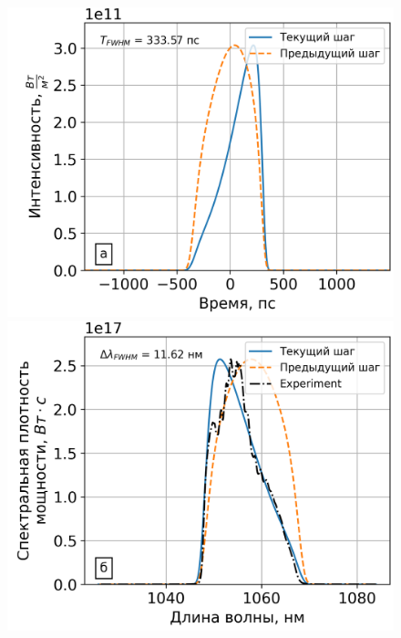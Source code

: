 \documentclass[12pt]{article}
\begin{document}
\begin{figure}[h!]
  \centering
  \begin{minipage}[b]{0.5\textwidth}
    \includegraphics[width=\linewidth]{Images/Gauss Pulse/Импульс и спектр/!8. Yb3+ 6_125, 0.9m_pusle}
  \end{minipage}%
  \begin{minipage}[b]{0.5\textwidth}
    \includegraphics[width=\linewidth]{Images/Gauss Pulse/Импульс и спектр/!8. Yb3+ 6_125, 0.9m_spectrum}
  \end{minipage}


\end{figure}
\end{document}
